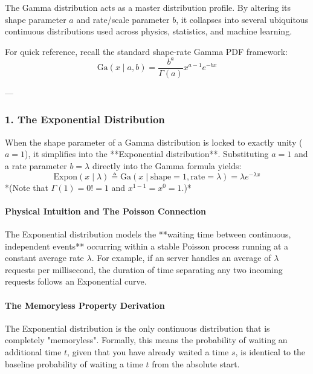 \documentclass{article}
\begin{document}
The Gamma distribution acts as a master distribution profile. By altering its shape parameter $a$ and rate/scale parameter $b$, it collapses into several ubiquitous continuous distributions used across physics, statistics, and machine learning.

For quick reference, recall the standard shape-rate Gamma PDF framework:
\begin{equation*}
\text{Ga}(x \mid a, b) = \frac{b^a}{\Gamma(a)} x^{a-1} e^{-bx}
\end{equation*}

---

\subsubsection*{1. The Exponential Distribution}

When the shape parameter of a Gamma distribution is locked to exactly unity ($a = 1$), it simplifies into the **Exponential distribution**. Substituting $a = 1$ and a rate parameter $b = \lambda$ directly into the Gamma formula yields:
\begin{equation}
\text{Expon}(x \mid \lambda) \triangleq \text{Ga}(x \mid \text{shape} = 1, \text{rate} = \lambda) = \lambda e^{-\lambda x} \tag{204}
\end{equation}
*(Note that $\Gamma(1) = 0! = 1$ and $x^{1-1} = x^0 = 1$.)*

\paragraph{Physical Intuition and The Poisson Connection}
The Exponential distribution models the **waiting time between continuous, independent events** occurring within a stable Poisson process running at a constant average rate $\lambda$. For example, if an server handles an average of $\lambda$ requests per millisecond, the duration of time separating any two incoming requests follows an Exponential curve.

\paragraph{The Memoryless Property Derivation}
The Exponential distribution is the only continuous distribution that is completely "memoryless". Formally, this means the probability of waiting an additional time $t$, given that you have already waited a time $s$, is identical to the baseline probability of waiting a time $t$ from the absolute start.
\end{document}
